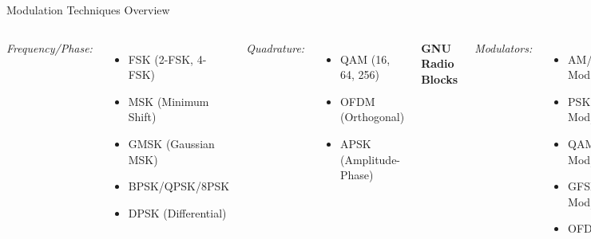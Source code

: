 \documentclass[aspectratio=169,11pt]{beamer}
\begin{document}
\begin{frame}{Modulation Techniques Overview}
\begin{columns}[T]
\textit{Frequency/Phase:}
\begin{itemize}
\small
    \item FSK (2-FSK, 4-FSK)
    \item MSK (Minimum Shift)
    \item GMSK (Gaussian MSK)
    \item BPSK/QPSK/8PSK
    \item DPSK (Differential)
\end{itemize}

\textit{Quadrature:}
\begin{itemize}
\small
    \item QAM (16, 64, 256)
    \item OFDM (Orthogonal)
    \item APSK (Amplitude-Phase)
\end{itemize}

\textbf{\color{blue}GNU Radio Blocks}

\textit{Modulators:}
\begin{itemize}
\small
    \item AM/FM/NBFM Mod
    \item PSK Mod/Demod
    \item QAM Mod/Demod
    \item GFSK Mod/Demod
    \item OFDM Tx/Rx
\end{itemize}

\textit{Supporting Blocks:}
\begin{itemize}
\small
    \item Constellation Object
    \item Symbol Sync
    \item Costas Loop
    \item Symbol Sync
    \item AGC
    \item FLL Band-Edge
\end{itemize}

\textit{Constellation Tools:}
\begin{itemize}
\small
    \item Constellation Sink
    \item Constellation Decoder
    \item Constellation Rect
\end{itemize}
\end{columns}
\end{frame}
\end{document}
